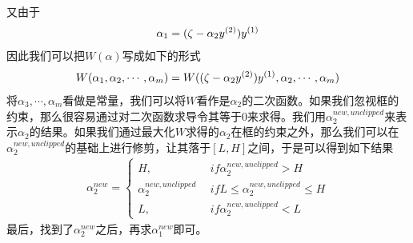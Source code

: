 又由于
\begin{eqnarray}
\alpha_1=(\zeta-\alpha_2{y}^{({2})}){y}^{({1})}
\end{eqnarray}
因此我们可以把$W(\alpha)$写成如下的形式
\begin{eqnarray}
W(\alpha_1,\alpha_2,\cdots,\alpha_m)=W((\zeta-\alpha_2{y}^{({2})}){y}^{({1})},\alpha_2,\cdots,\alpha_m)
\end{eqnarray}
将$\alpha_3,\cdots,\alpha_m$看做是常量，我们可以将$W$看作是$\alpha_2$的二次函数。如果我们忽视框的约束，那么很容易通过对二次函数求导令其等于0来求得。我们用$\alpha_2^{new,unclipped}$来表示$\alpha_2$的结果。如果我们通过最大化$W$求得的$\alpha_2$在框的约束之外，那么我们可以在$\alpha_2^{new,unclipped}$的基础上进行修剪，让其落于$[L,H]$之间，于是可以得到如下结果
\begin{eqnarray}
\alpha_2^{new}=
\left\lbrace
\begin{aligned}
H,&\ \ if \alpha_2^{new,unclipped}>H\\
\alpha_2^{new,unclipped}&\ \ if L\leq \alpha_2^{new,unclipped} \leq H\\
L,&\ \ if \alpha_2^{new,unclipped}<L
\end{aligned}
\right.
\end{eqnarray}
最后，找到了$\alpha_2^{new}$之后，再求$\alpha_1^{new}$即可。




